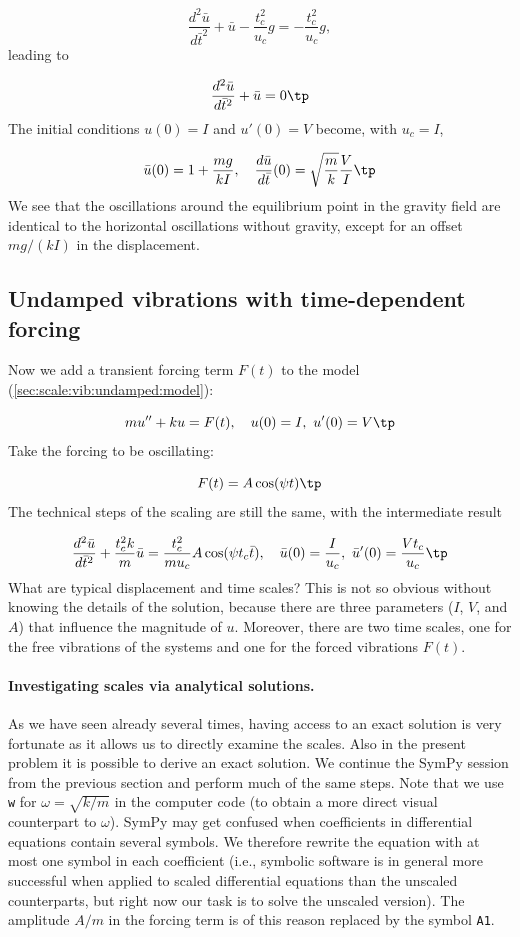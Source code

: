 \documentclass[graybox,envcountchap,sectrefs,final]{svmonodo}
\begin{document}
\[ \frac{d^2\bar u}{d\bar t^2} + \bar u - \frac{t_c^2}{u_c}g
= -\frac{t_c^2}{u_c}g,\]
leading to

\[ \frac{d^2\bar u}{d\bar t^2} + \bar u = 0\tp\]
The initial conditions $u(0)=I$ and $u'(0)=V$ become, with $u_c=I$,

\[ \bar u(0) = 1 + \frac{mg}{kI},\quad \frac{d\bar u}{d\bar t}(0)=\sqrt{\frac{m}{k}}\frac{V}{I}\tp\]
We see that the oscillations around the equilibrium point in the
gravity field are identical to the horizontal oscillations without
gravity, except for an offset $mg/(kI)$ in the displacement.


\subsection{Undamped vibrations with time-dependent forcing}
\label{sec:scale:vib:undamped:F}

Now we add a transient forcing term $F(t)$ to the model
(\ref{sec:scale:vib:undamped:model}):

\begin{equation}
mu'' + ku = F(t),\quad u(0)=I,\ u'(0)=V\tp
\label{sec:scale:vib:undamped:F:model}
\end{equation}
Take the forcing to be oscillating:

\[ F(t) = A\cos(\psi t)\tp\]
The technical steps of the scaling are still the same, with the
intermediate result

\begin{equation}
\frac{d^2\bar u}{d\bar t^2} + \frac{t_c^2 k}{m}\bar u =
\frac{t_c^2}{mu_c}A\cos(\psi t_c\bar t),
\quad \bar u(0)=\frac{I}{u_c},\ \bar u'(0)=\frac{Vt_c}{u_c}\tp
\label{sec:scale:vib:undamped:F:model:scaled0}
\end{equation}
What are typical displacement and time scales? This is not so obvious
without knowing the details of the solution, because there are
three parameters ($I$, $V$, and $A$) that influence the magnitude of $u$.
Moreover, there are two time scales, one for the free vibrations of
the systems and one for the forced vibrations $F(t)$.

\paragraph{Investigating scales via analytical solutions.}
As we have seen already several times, having access to
an exact solution is very fortunate as it allows us to directly
examine the scales. Also in the present problem it is possible
to derive an exact solution. We
continue the SymPy session from the previous section and perform much
of the same steps. Note that we use \texttt{w} for $\omega = \sqrt{k/m}$
in the computer code (to obtain a more direct visual counterpart to
$\omega$).
SymPy may get confused when coefficients in differential equations
contain several symbols. We therefore rewrite the equation with
at most one symbol in each coefficient (i.e., symbolic software is
in general
more successful when applied to scaled differential equations than the
unscaled counterparts, but right now our task is to solve the unscaled version).
The amplitude $A/m$ in the forcing term is of this reason
replaced by the symbol \texttt{A1}.
\end{document}

